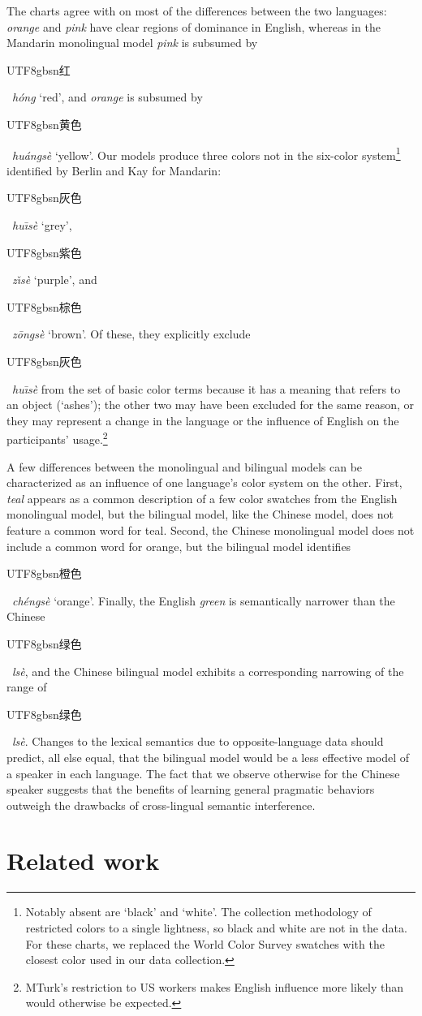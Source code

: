 \documentclass[11pt,a4paper]{article}
\newenvironment{zh}{\begin{CJK}{UTF8}{gbsn}}{\end{CJK}}
\newcommand{\textzh}[2]{\begin{zh}#1\end{zh}~\emph{#2}}
\renewcommand{\|}{\mid}
\begin{document}
The charts agree with \citet{BerlinKay1969} on most of the differences between the two languages:
\emph{orange} and \emph{pink} have clear regions of dominance in English, whereas in the Mandarin
monolingual model \emph{pink} is subsumed by \textzh{红}{h\'ong} `red', and \emph{orange} is subsumed by \textzh{黄色}{hu\'angs\`e} `yellow'. Our models produce three colors not in the six-color system\footnote{Notably absent are `black' and `white'. The collection methodology of \citet{Monroe2017} restricted colors to a single lightness, so black and white are not in the data. For these charts, we replaced the World Color Survey swatches with the closest color used in our data collection.} identified by Berlin and Kay for Mandarin: \textzh{灰色}{hu\={\i}s\`e} `grey', \textzh{紫色}{z\v{\i}s\`e} `purple', and \textzh{棕色}{z\=ongs\`e} `brown'. Of these, they explicitly exclude \textzh{灰色}{hu\={\i}s\`e} from the set of basic color terms because it has a meaning that refers to an object (`ashes'); the other two may have been excluded for the same reason, or they may represent a change in the language or the influence of English on the participants' usage.\footnote{MTurk's restriction to US workers makes English influence more likely than would otherwise be expected.}

A few differences between the monolingual and bilingual models can be characterized as an influence of
one language's color system on the other. First, \emph{teal} appears as a common description of a few color 
swatches from the English monolingual model, but the bilingual model, like the Chinese model, does not feature 
a common word for teal. Second, the Chinese monolingual model does not include a common word for orange, but
the bilingual model identifies \textzh{橙色}{ch\'engs\`e} `orange'. Finally, the English 
\emph{green} is semantically narrower than the Chinese \textzh{绿色}{ls\`e}, and the
Chinese bilingual model exhibits a corresponding narrowing of the range of 
\textzh{绿色}{ls\`e}. Changes to the lexical semantics due to
opposite-language data should predict, all else equal, that the bilingual model would be a less effective model
of a speaker in each language. The fact that we observe otherwise for the Chinese speaker suggests
that the benefits of learning general pragmatic behaviors outweigh the
drawbacks of cross-lingual semantic interference.

\section{Related work}
\end{document}
